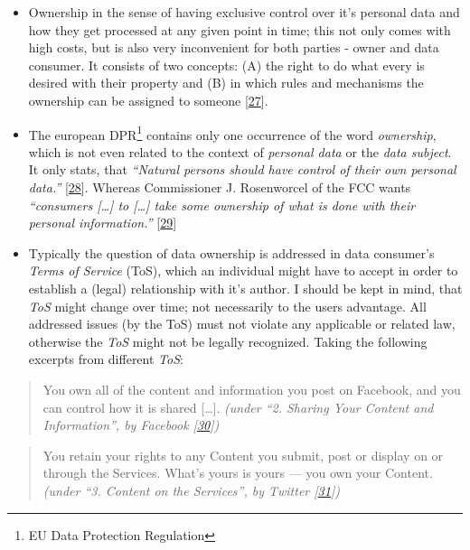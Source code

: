 \documentclass[12pt,english,a4paper,titlepage,cleardoublepage=empty,dottedtoc]{report}
\begin{document}
\begin{itemize}
\item
  Ownership in the sense of having exclusive control over it's personal
  data and how they get processed at any given point in time; this not
  only comes with high costs, but is also very inconvenient for both
  parties - owner and data consumer. It consists of two concepts: (A)
  the right to do what every is desired with their property and (B) in
  which rules and mechanisms the ownership can be assigned to someone
  {[}\protect\hyperlink{ref-book_1987_private-ownership_definition}{27}{]}.
\item
  The european DPR\footnote{EU Data Protection Regulation} contains only
  one occurrence of the word \emph{ownership}, which is not even related
  to the context of \emph{personal data} or the \emph{data subject}. It
  only stats, that \emph{``Natural persons should have control of their
  own personal data.''}
  {[}\protect\hyperlink{ref-regulation_2016_eu_general-data-protection-regulation_ownership}{28}{]}.
  Whereas Commissioner J. Rosenworcel of the FCC wants \emph{``consumers
  {[}\ldots{}{]} to {[}\ldots{}{]} take some ownership of what is done
  with their personal information.''}
  {[}\protect\hyperlink{ref-rules_2016_fcc_to-protect-broadband-consumer-privacy_ownership}{29}{]}
\item
  Typically the question of data ownership is addressed in data
  consumer's \emph{Terms of Service} (ToS), which an individual might
  have to accept in order to establish a (legal) relationship with it's
  author. I should be kept in mind, that \emph{ToS} might change over
  time; not necessarily to the users advantage. All addressed issues (by
  the ToS) must not violate any applicable or related law, otherwise the
  \emph{ToS} might not be legally recognized. Taking the following
  excerpts from different \emph{ToS}:
\end{itemize}

\begin{quote}
You own all of the content and information you post on Facebook, and you
can control how it is shared {[}\ldots{}{]}. \emph{(under ``2. Sharing
Your Content and Information'', by Facebook
{[}\protect\hyperlink{ref-web_2016_facebook_terms-of-service}{30}{]})}
\end{quote}

\begin{quote}
You retain your rights to any Content you submit, post or display on or
through the Services. What's yours is yours --- you own your Content.
\emph{(under ``3. Content on the Services'', by Twitter
{[}\protect\hyperlink{ref-web_2016_twitter_terms-of-service}{31}{]})}
\end{quote}
\end{document}
